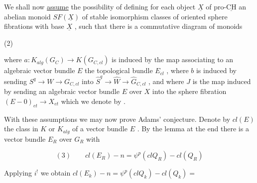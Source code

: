 
We shall now \uline{assume}  the possibility of defining
for each object $\underline{X}$ of pro-$\underline{\mathrm{CH}}$ an abelian monoid $SF(\underline{X})$ of stable
isomorphism classes of oriented sphere fibrations with base $\underline{X}$ ,
such that there is a commutative diagram of monoids

(2)

where $a:K_{alg}(G_C) \to K(G_{C,cl})$ is induced by the map associating to
an algebraic vector bundle $E$ the topological bundle $E_{cl}$ , where
$b$ is induced by sending $S^q \to W \to G_{C,cl}$ into $\hat{S}^q \to \hat{W} \to \hat{G}_{C,cl}$ ,
and where $J$ is the map induced by sending an algebraic vector
bundle $E$ over $X$ into the sphere fibration $(E - 0)_{et} \to X_{et}$
which we denote by  .

With these assumptions we may now prove Adams' conjecture.
Denote by $cl(E)$ the class in $K$ or $K_{alg}$ of a vector bundle $E$ .
By the lemma at the end there is a vector bundle $E_R$ over $G_R$ with

\[ (3) \qquad cl(E_R) - n = \psi^p(clQ_R) - cl(Q_R) \]

Applying $i^!$ we obtain $cl(E_k) - n = \psi^p(clQ_k) - cl(Q_k) =$

